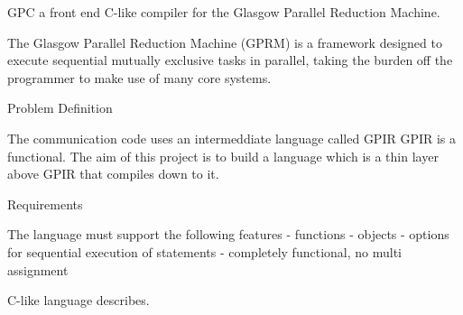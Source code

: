 

GPC a front end C-like compiler for the Glasgow Parallel Reduction Machine.


The Glasgow Parallel Reduction Machine (GPRM) is a framework designed
to execute sequential mutually exclusive tasks in parallel, taking
the burden off the programmer to make use of many core systems. 

Problem Definition

The communication code uses an intermeddiate language called GPIR
GPIR is a functional. The aim of this project is to build a language which is
a thin layer above GPIR that compiles down to it.

Requirements

The language must support the following features
    - functions
    - objects 
    - options for sequential execution of statements
    - completely functional, no multi assignment




C-like language describes. 
